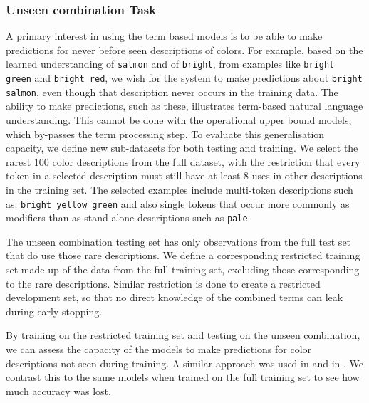 \documentclass[]{clv3}
\newcommand{\textcite}{\citet}
\begin{document}
\subsubsection{Unseen combination Task} \label{sec:extrapodata}
A primary interest in using the term based models is to be able to make predictions for never before seen descriptions of colors.
For example, based on the learned understanding of \texttt{salmon} and of \texttt{bright}, from examples like \texttt{bright green} and \texttt{bright red}, we wish for the system to make predictions about \texttt{bright salmon}, even though that description never occurs in the training data.
The ability to make predictions, such as these, illustrates term-based natural language understanding.
This cannot be done with the operational upper bound models, which by-passes the term processing step.
%
To evaluate this generalisation capacity, we define new sub-datasets for both testing and training.
We select the rarest 100 color descriptions from the full dataset,
with the restriction that every token in a selected description must still have at least 8 uses in other descriptions in the training set.
The selected examples include multi-token descriptions such as: \texttt{bright yellow green} and also single tokens that occur more commonly as modifiers than as stand-alone descriptions such as \texttt{pale}.

The unseen combination testing set has only observations from the full test set that do use those rare descriptions.
We define a corresponding restricted training set made up of the data from the full training set, excluding those  corresponding to the rare descriptions.
Similar restriction is done to create a restricted development set, so that no direct knowledge of the combined terms can leak during early-stopping.


By training on the restricted training set and testing on the unseen combination, we can assess the capacity of the models to make predictions for color descriptions not seen during training.
A similar approach was used in \textcite{acl2018WinnLighter} and in \textcite{DBLP:journals/corr/AtzmonBKGC16}.
We contrast this to the same models when trained on the full training set to see how much accuracy was lost.
\end{document}
